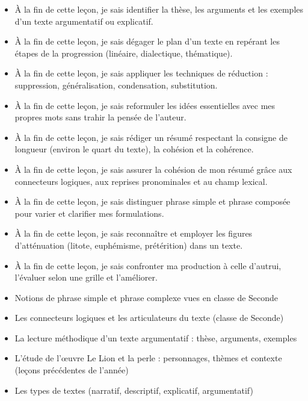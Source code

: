 \documentclass[11pt]{article}
\begin{document}
\begin{objectifs}
\begin{itemize}
\item À la fin de cette leçon, je sais identifier la thèse, les arguments et les exemples d'un texte argumentatif ou explicatif.
\item À la fin de cette leçon, je sais dégager le plan d'un texte en repérant les étapes de la progression (linéaire, dialectique, thématique).
\item À la fin de cette leçon, je sais appliquer les techniques de réduction : suppression, généralisation, condensation, substitution.
\item À la fin de cette leçon, je sais reformuler les idées essentielles avec mes propres mots sans trahir la pensée de l'auteur.
\item À la fin de cette leçon, je sais rédiger un résumé respectant la consigne de longueur (environ le quart du texte), la cohésion et la cohérence.
\item À la fin de cette leçon, je sais assurer la cohésion de mon résumé grâce aux connecteurs logiques, aux reprises pronominales et au champ lexical.
\item À la fin de cette leçon, je sais distinguer phrase simple et phrase composée pour varier et clarifier mes formulations.
\item À la fin de cette leçon, je sais reconnaître et employer les figures d'atténuation (litote, euphémisme, prétérition) dans un texte.
\item À la fin de cette leçon, je sais confronter ma production à celle d'autrui, l'évaluer selon une grille et l'améliorer.
\end{itemize}
\end{objectifs}

\begin{prerequis}
\begin{itemize}
\item Notions de phrase simple et phrase complexe vues en classe de Seconde
\item Les connecteurs logiques et les articulateurs du texte (classe de Seconde)
\item La lecture méthodique d'un texte argumentatif : thèse, arguments, exemples
\item L'étude de l'œuvre Le Lion et la perle : personnages, thèmes et contexte (leçons précédentes de l'année)
\item Les types de textes (narratif, descriptif, explicatif, argumentatif)
\end{itemize}
\end{prerequis}
\end{document}
